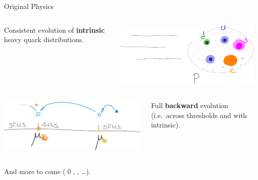 \documentclass[9pt]{beamer}
\begin{document}
\begin{frame}{Original Physics}

    \begin{columns}
        \begin{column}{0.4\textwidth}
            Consistent evolution of \textbf{intrinsic} heavy quark
            distributions.
        \end{column}
        \begin{column}{0.5\textwidth}
            \begin{center}
                \includegraphics[width=0.9\linewidth]{intrinsic}
            \end{center}
        \end{column}
    \end{columns}

    \vspace*{10pt}
    \begin{columns}
        \begin{column}{0.5\textwidth}
            \begin{center}
                \includegraphics[width=0.9\linewidth]{back-vfns}
            \end{center}
        \end{column}
        \begin{column}{0.4\textwidth}
            Full \textbf{backward \vfns{}} evolution (i.e.\ across thresholds
            and with intrinsic).
        \end{column}
    \end{columns}

    \vspace*{35pt}
    And more to come (\qed{}, \nnnlo{}, \dots).
\end{frame}
\end{document}
